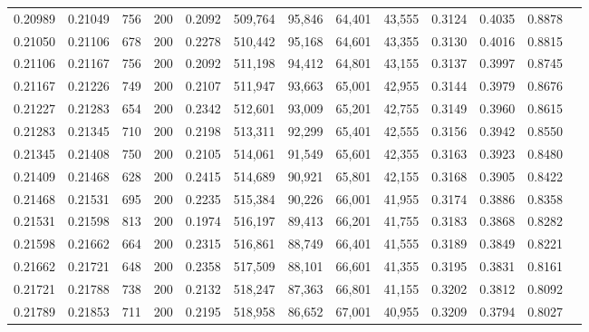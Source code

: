 \begin{tabular}{rrrrrrrrrrrrr}
0.20989 & 0.21049 &   756 & 200 &                                     0.2092 & 509,764 &  95,846 &  64,401 &  43,555 & 0.3124 & 0.4035 & 0.8878 \\
0.21050 & 0.21106 &   678 & 200 &                                     0.2278 & 510,442 &  95,168 &  64,601 &  43,355 & 0.3130 & 0.4016 & 0.8815 \\
0.21106 & 0.21167 &   756 & 200 &                                     0.2092 & 511,198 &  94,412 &  64,801 &  43,155 & 0.3137 & 0.3997 & 0.8745 \\
0.21167 & 0.21226 &   749 & 200 &                                     0.2107 & 511,947 &  93,663 &  65,001 &  42,955 & 0.3144 & 0.3979 & 0.8676 \\
0.21227 & 0.21283 &   654 & 200 &                                     0.2342 & 512,601 &  93,009 &  65,201 &  42,755 & 0.3149 & 0.3960 & 0.8615 \\
0.21283 & 0.21345 &   710 & 200 &                                     0.2198 & 513,311 &  92,299 &  65,401 &  42,555 & 0.3156 & 0.3942 & 0.8550 \\
0.21345 & 0.21408 &   750 & 200 &                                     0.2105 & 514,061 &  91,549 &  65,601 &  42,355 & 0.3163 & 0.3923 & 0.8480 \\
0.21409 & 0.21468 &   628 & 200 &                                     0.2415 & 514,689 &  90,921 &  65,801 &  42,155 & 0.3168 & 0.3905 & 0.8422 \\
0.21468 & 0.21531 &   695 & 200 &                                     0.2235 & 515,384 &  90,226 &  66,001 &  41,955 & 0.3174 & 0.3886 & 0.8358 \\
0.21531 & 0.21598 &   813 & 200 &                                     0.1974 & 516,197 &  89,413 &  66,201 &  41,755 & 0.3183 & 0.3868 & 0.8282 \\
0.21598 & 0.21662 &   664 & 200 &                                     0.2315 & 516,861 &  88,749 &  66,401 &  41,555 & 0.3189 & 0.3849 & 0.8221 \\
0.21662 & 0.21721 &   648 & 200 &                                     0.2358 & 517,509 &  88,101 &  66,601 &  41,355 & 0.3195 & 0.3831 & 0.8161 \\
0.21721 & 0.21788 &   738 & 200 &                                     0.2132 & 518,247 &  87,363 &  66,801 &  41,155 & 0.3202 & 0.3812 & 0.8092 \\
0.21789 & 0.21853 &   711 & 200 &                                     0.2195 & 518,958 &  86,652 &  67,001 &  40,955 & 0.3209 & 0.3794 & 0.8027 \\

\end{tabular}
